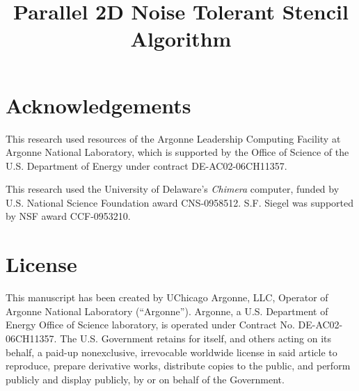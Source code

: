 \documentclass{article}
\theoremstyle{definition}
\begin{document}
%
\title{Parallel 2D Noise Tolerant Stencil Algorithm}

%
%
%








\section{Acknowledgements}

This research used resources of the Argonne Leadership Computing
Facility at Argonne National Laboratory, which
is supported by the Office of Science of the U.S.
Department of Energy under contract DE-AC02-06CH11357.

This research used the University of Delaware's \emph{Chimera}
computer, funded by U.S. National Science Foundation award CNS-0958512.
S.F. Siegel was supported by NSF award CCF-0953210.

%
%

\section{License}

This manuscript has been created by UChicago Argonne, LLC, Operator of %
Argonne National Laboratory (``Argonne'').  Argonne, a U.S. Department of Energy
Office of Science laboratory, is operated under Contract No. DE-AC02-06CH11357.
The U.S. Government retains for itself, and others acting on its behalf, a
paid-up nonexclusive, irrevocable worldwide license in said article to reproduce,
prepare derivative works, distribute copies to the public, and perform publicly
and display publicly, by or on behalf of the Government.
\end{document}
